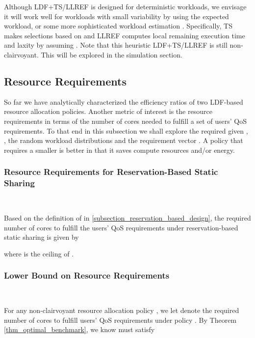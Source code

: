 \documentclass[prodmode,acmtompecs]{acmsmall}
\newcommand{\myComments}[1]{}
\newif\ifdissertation
\newcommand{\dissertationStart}{\ifdissertation  \myComments{Dissertation version: }}
\newcommand{\commentEnd}{\myComments{End}}
\begin{document}
Although LDF+TS/LLREF is designed for deterministic workloads, we envisage it will work well for workloads with small variability by using the expected workload, or some more sophisticated workload estimation . Specifically, TS makes selections based on  and LLREF computes local remaining execution time and laxity by assuming . 
Note that this heuristic LDF+TS/LLREF is still non-clairvoyant. This will be explored in the simulation section. 

\dissertationStart
This heuristic LDF+TS/LLREF is still non-clairvoyant but picking appropriate  is key to the performance. 
On one hand big  reduces the number of tasks selected per period and on the other hand small  may cause user 's task fail to complete. 
In the simulation section, we will show such a policy performs well for NBUE workloads that are not deterministic but have small variability. 
\commentEnd\fi

\subsection{Resource Requirements}

So far we have analytically characterized the efficiency ratios of two LDF-based resource allocation policies. Another metric of interest is the resource requirements in terms of the number of cores  needed to fulfill a set of users' QoS requirements. To that end in this subsection we shall explore the required  given , , the random workload distributions and the requirement vector . A policy that requires a smaller  is better in that it saves compute resources and/or energy. 

\subsubsection{Resource Requirements for Reservation-Based Static Sharing}
~

Based on the definition of  in \ref{subsection_reservation_based_design}, the required number of cores to fulfill the users' QoS requirements  under reservation-based static sharing is given by

where  is the ceiling of . 

\subsubsection{Lower Bound on Resource Requirements}
~

For any non-clairvoyant resource allocation policy , we let  denote the required number of cores to fulfill users' QoS requirements under policy . 
By Theorem \ref{thm_optimal_benchmark}, we know  must satisfy 
\end{document}

